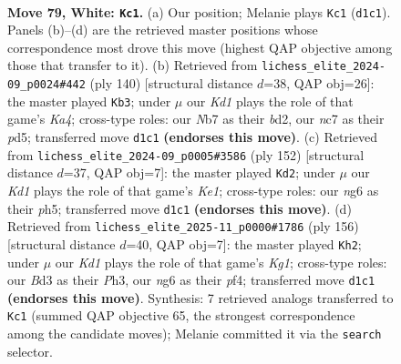 \documentclass[11pt]{article}
\begin{document}
\clearpage

\begin{figure}[p]\centering
\begin{subfigure}{0.46\textwidth}\centering
\resizebox{\linewidth}{!}{%
\newchessgame
\chessboard[
  setfen={8/1Nn5/5kn1/p7/Pb1pP3/1P1B3p/4P3/3K4 w - - 24 79},
  showmover=false,
  pgfstyle=straightmove, color=movearrow, markmove={d1-c1}
]}
\caption{}
\end{subfigure}\hfill
\begin{subfigure}{0.46\textwidth}\centering
\resizebox{\linewidth}{!}{%
\newchessgame
\chessboard[
  setfen={8/1k6/1p4p1/1P1pBpP1/K2P1P2/8/3b4/8 w - - 6 71},
  showmover=false,
  pgfstyle=straightmove, color=movearrow, markmove={a4-b3}
]}
\caption{}
\end{subfigure}
\\[4pt]
\begin{subfigure}{0.46\textwidth}\centering
\resizebox{\linewidth}{!}{%
\newchessgame
\chessboard[
  setfen={8/8/p3pBk1/Pb2P2p/1P5P/8/8/4K3 w - - 34 77},
  showmover=false,
  pgfstyle=straightmove, color=movearrow, markmove={e1-d2}
]}
\caption{}
\end{subfigure}\hfill
\begin{subfigure}{0.46\textwidth}\centering
\resizebox{\linewidth}{!}{%
\newchessgame
\chessboard[
  setfen={8/rB6/8/1bN1k3/1P3p1p/5P1P/6P1/6K1 w - - 4 79},
  showmover=false,
  pgfstyle=straightmove, color=movearrow, markmove={g1-h2}
]}
\caption{}
\end{subfigure}
\caption{\textbf{Move 79, White: \texttt{Kc1}.} (a) Our position; Melanie plays \texttt{Kc1} (\texttt{d1c1}). Panels (b)--(d) are the retrieved master positions whose correspondence most drove this move (highest QAP objective among those that transfer to it). (b) Retrieved from \texttt{lichess\_elite\_2024-09\_p0024\#442} (ply 140) [structural distance $d$=38, QAP obj=26]: the master played \texttt{Kb3}; under $\mu$ our \emph{Kd1} plays the role of that game's \emph{Ka4}; cross-type roles: our \emph{N}b7 as their \emph{b}d2, our \emph{n}c7 as their \emph{p}d5; transferred move \texttt{d1c1} \textbf{(endorses this move)}. (c) Retrieved from \texttt{lichess\_elite\_2024-09\_p0005\#3586} (ply 152) [structural distance $d$=37, QAP obj=7]: the master played \texttt{Kd2}; under $\mu$ our \emph{Kd1} plays the role of that game's \emph{Ke1}; cross-type roles: our \emph{n}g6 as their \emph{p}h5; transferred move \texttt{d1c1} \textbf{(endorses this move)}. (d) Retrieved from \texttt{lichess\_elite\_2025-11\_p0000\#1786} (ply 156) [structural distance $d$=40, QAP obj=7]: the master played \texttt{Kh2}; under $\mu$ our \emph{Kd1} plays the role of that game's \emph{Kg1}; cross-type roles: our \emph{B}d3 as their \emph{P}h3, our \emph{n}g6 as their \emph{p}f4; transferred move \texttt{d1c1} \textbf{(endorses this move)}. Synthesis: 7 retrieved analogs transferred to \texttt{Kc1} (summed QAP objective 65, the strongest correspondence among the candidate moves); Melanie committed it via the \texttt{search} selector.}
\label{fig:thought-m156}
\end{figure}
\end{document}

